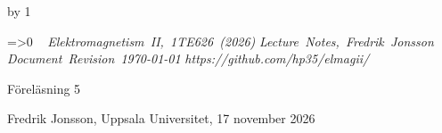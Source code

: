 {{{{\cleardoublepage
%
%
%
%
%
%
%
\def\coursename{Elektromagnetism II}
\def\coursecode{1TE626}
\def\courseyear{2026}
\def\courserepo{https://github.com/hp35/elmagii/}
\def\lecturenumber{5}
\def\lecturetitle{Elektrodynamik -- Elektromagnetisk induktion}
\def\lecturesubtitle{}
\def\lectureauthor{Fredrik Jonsson}
\def\lectureplace{Uppsala Universitet}
\def\lecturedate{17 november 2026}
\edef\expandedlecturenumber{5}
\def\ifempty#1{\ifx\relax#1\relax}
\advance\chapno by 1
\immediate{}
\hsize=150mm\hoffset=4.6mm\vsize=230mm\voffset=7mm
\topskip=0pt\baselineskip=12pt\parskip=0pt\leftskip=0pt\parindent=15pt
\ifcolors
  \voffset=-10.2mm\topskip=0pt
\fi
\headline={\ifnum\secno>0\ifodd\pageno\rightheadline\else\leftheadline\fi
  \else\hfill\fi}
\def\rightheadline{\tenrm{\it F\"orel\"asning 5}
  \hfil{\it \coursename, \coursecode\ (\courseyear)}}
\def\leftheadline{\tenrm{\it \coursename, \coursecode\ (\courseyear)}
  \hfil{\it F\"orel\"asning 5}}
\noindent~\vskip-60pt\hskip-40pt{}
\vskip-42pt\hfill\vbox{
    \hbox{{\it \coursename, \coursecode\ (\courseyear)}}
    \hbox{{\it Lecture Notes, \lectureauthor}}
    \hbox{{\it Document Revision \today}}
    \hbox{{\it \courserepo}}}\vskip 36pt
\centerline{\twelvesc F\"orel\"asning 5}
\vskip 24pt\noindent
\centerline{}
\expandafter\ifempty\expandafter{\lecturesubtitle}%
  \else\centerline{\twelvesc\lecturesubtitle}\fi
\bigskip
\centerline{\lectureauthor, \lectureplace, \lecturedate}
\vskip24pt



}}}}
